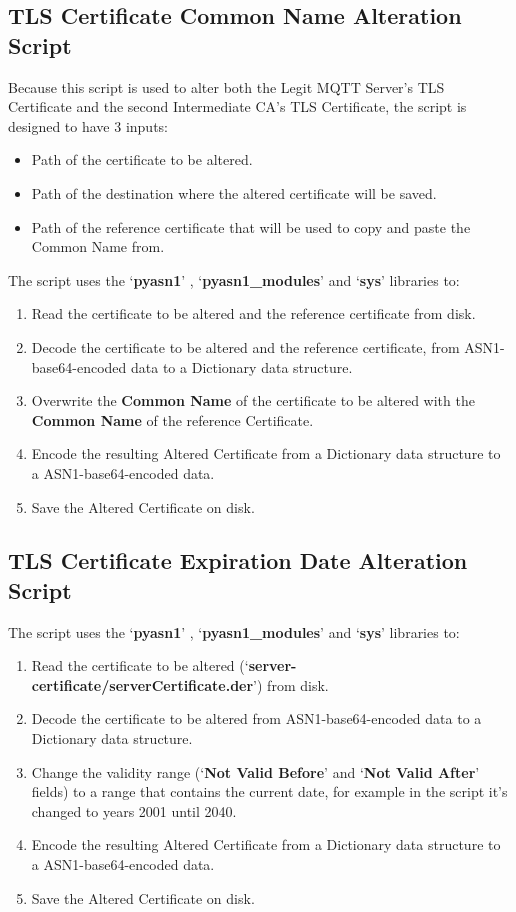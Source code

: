\documentclass[binding=0.6cm,noexaminfo]{sapthesis}
\begin{document}
\subsection{TLS Certificate Common Name Alteration Script}

Because this script is used to alter both the Legit MQTT Server's TLS Certificate and the second Intermediate CA's TLS Certificate, the script is designed to have 3 inputs:
\begin{itemize}
	\item Path of the certificate to be altered.
	\item Path of the destination where the altered certificate will be saved.
	\item Path of the reference certificate that will be used to copy and paste the Common Name from.
\end{itemize}
The script uses the `\textbf{pyasn1}' , `\textbf{pyasn1\_modules}' and `\textbf{sys}' libraries to:
\begin{enumerate}
	\item Read the certificate to be altered and the reference certificate from disk.
	\item Decode the certificate to be altered and the reference certificate, from ASN1-base64-encoded data to a Dictionary data structure.
	\item Overwrite the \textbf{Common Name} of the certificate to be altered with the \textbf{Common Name} of the reference Certificate.
	\item Encode the resulting Altered Certificate from a Dictionary data structure to a ASN1-base64-encoded data.
	\item Save the Altered Certificate on disk.
\end{enumerate}

\subsection{TLS Certificate Expiration Date Alteration Script}

The script uses the `\textbf{pyasn1}' , `\textbf{pyasn1\_modules}' and `\textbf{sys}' libraries to:
\begin{enumerate}
	\item Read the certificate to be altered (`\textbf{server-certificate/serverCertificate.der}') from disk.
	\item Decode the certificate to be altered from ASN1-base64-encoded data to a Dictionary data structure.
	\item Change the validity range (`\textbf{Not Valid Before}' and `\textbf{Not Valid After}' fields) to a range that contains the current date, for example in the script it's changed to years 2001 until 2040.
	\item Encode the resulting Altered Certificate from a Dictionary data structure to a ASN1-base64-encoded data.
	\item Save the Altered Certificate on disk.
\end{enumerate}
\end{document}
